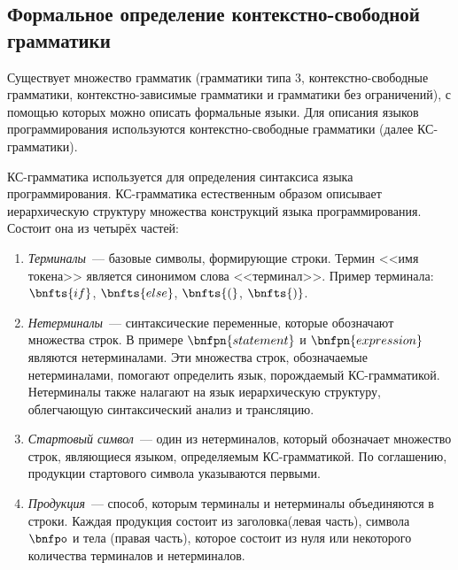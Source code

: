 \subsection{Формальное определение контекстно-свободной грамматики} \label{sub114}

Существует множество грамматик (грамматики типа 3, контекстно-свободные грамматики, контекстно-зависимые грамматики и грамматики без ограничений), с помощью которых можно описать формальные языки. Для описания языков программирования используются контекстно-свободные грамматики  (далее КС-грамматики).

КС-грамматика используется для определения синтаксиса языка программирования. КС-грамматика естественным образом описывает иерархическую структуру множества конструкций языка программирования. Состоит она из четырёх частей:

\begin{enumerate} 
	\item{\textit{Терминалы}~--- базовые символы, формирующие строки. Термин <<имя токена>> является синонимом слова <<терминал>>. Пример терминала: $\bnfts{if}$, $\bnfts{else}$, $\bnfts{(}$, $\bnfts{)}$}.
	\item{\textit{Нетерминалы}~--- синтаксические переменные, которые обозначают множества строк. В примере $\bnfpn{statement}$ и $\bnfpn{expression}$ являются нетерминалами. Эти множества строк, обозначаемые нетерминалами, помогают определить язык, порождаемый КС-грамматикой. Нетерминалы также налагают на язык иерархическую структуру, облегчающую синтаксический анализ и трансляцию.}
	\item{\textit{Стартовый символ}~--- один из нетерминалов, который обозначает множество строк, являющиеся языком, определяемым КС-грамматикой. По соглашению, продукции стартового символа указываются первыми.}
	\item{\textit{Продукция}~--- способ, которым терминалы и нетерминалы объединяются в строки. Каждая продукция состоит из заголовка(левая часть), символа $\bnfpo$ и тела (правая часть), которое состоит из нуля или некоторого количества терминалов и нетерминалов.}
\end{enumerate}


\begin{bnf*}
	{ \bnfsp \bnfts{+} \bnfsp {}}\\
	{ \bnfsp \bnfts{-} \bnfsp {}}\\
	{}\\
	{ \bnfsp \bnfts{*} \bnfsp {}}\\
	{ \bnfsp \bnfts{/} \bnfsp {}}\\
	{}\\
	{\bnfts{(} \bnfsp {} \bnfts{)}}\\
\end{bnf*}